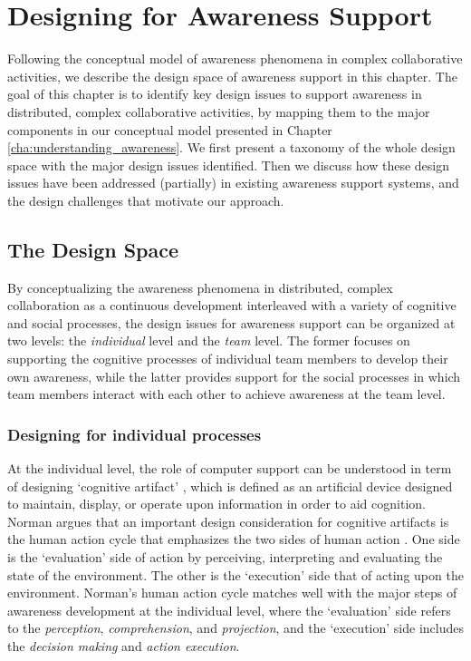 \graphicspath{{Figures/}}

\chapter{Designing for Awareness Support} %
\label{cha:designing_for_awareness_support}
Following the conceptual model of awareness phenomena in complex collaborative activities, we describe the design space of awareness support in this chapter. The goal of this chapter is to identify key design issues to support awareness in distributed, complex collaborative activities, by mapping them to the major components in our conceptual model presented in Chapter \ref{cha:understanding_awareness}. We first present a taxonomy of the whole design space with the major design issues identified. Then we discuss how these design issues have been addressed (partially) in existing awareness support systems, and the design challenges that motivate our approach. 

\section{The Design Space} %
\label{sec:the_design_space}
By conceptualizing the awareness phenomena in distributed, complex collaboration as a continuous development interleaved with a variety of cognitive and social processes, the design issues for awareness support can be organized at two levels: the \emph{individual} level and the \emph{team} level. The former focuses on supporting the cognitive processes of individual team members to develop their own awareness, while the latter provides support for the social processes in which team members interact with each other to achieve awareness at the team level. 

\subsection{Designing for individual processes} %
\label{sub:designing_for_individuals}
At the individual level, the role of computer support can be understood in term of designing `cognitive artifact' \cite{Norman1992}, which is defined as an artificial device designed to maintain, display, or operate upon information in order to aid cognition. Norman argues that an important design consideration for cognitive artifacts is the human action cycle that emphasizes the two sides of human action \cite{Norman1992}. One side is the `evaluation' side of action by perceiving, interpreting and evaluating the state of the environment. The other is the `execution' side that of acting upon the environment. Norman's human action cycle matches well with the major steps of awareness development at the individual level, where the `evaluation' side refers to the \emph{perception}, \emph{comprehension}, and \emph{projection}, and the `execution' side includes the \emph{decision making} and \emph{action execution}.

